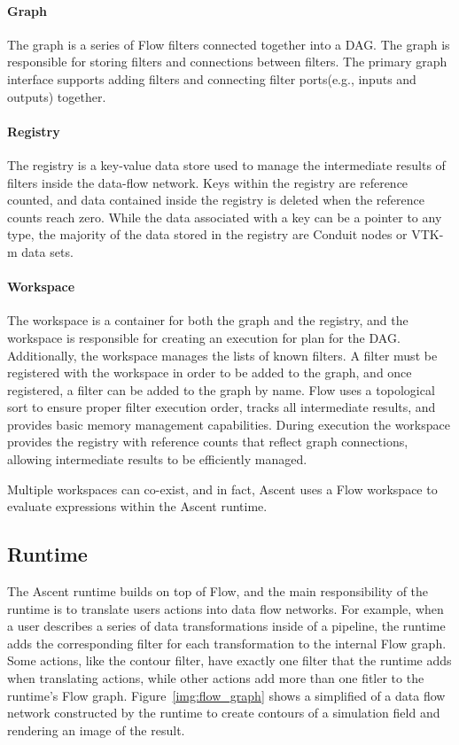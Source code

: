 \paragraph{Graph}
The graph is a series of Flow filters connected together into
a DAG.
%
The graph is responsible for storing filters and connections
between filters.
%
The primary graph interface supports adding filters and connecting
filter ports(e.g., inputs and outputs) together.

\paragraph{Registry}
The registry is a key-value data store used to manage the intermediate
results of filters inside the data-flow network.
%
Keys within the registry are reference counted, and data contained
inside the registry is deleted when the reference counts reach zero.
%
While the data associated with a key can be a pointer to any type,
the majority of the data stored in the registry are Conduit nodes
or VTK-m data sets.


\paragraph{Workspace}
The workspace is a container for both the graph and the registry,
and the workspace is responsible for creating an execution for plan
for the DAG.
%
Additionally, the workspace manages the lists of known filters.
%
A filter must be registered with the workspace in order to be added to the
graph, and once registered, a filter can be added to the graph by name.
%
Flow uses a topological sort to ensure proper filter execution order,
tracks all intermediate results, and provides basic memory management capabilities.
During execution the workspace provides the registry with reference counts that reflect graph connections, allowing intermediate results to be efficiently managed.

%
Multiple workspaces can co-exist, and in fact, Ascent uses a Flow workspace
to evaluate expressions within the Ascent runtime.
%

\subsection{Runtime}
The Ascent runtime builds on top of Flow, and the main responsibility of the
runtime is to translate users actions into data flow networks.
%
For example, when a user describes a series of data transformations inside of a pipeline,
the runtime adds the corresponding filter for each transformation to
the internal Flow graph.
%
Some actions, like the contour filter, have exactly one filter that the runtime
adds when translating actions, while other actions add more than one fitler to the runtime's
Flow graph.
%
Figure~\ref{img:flow_graph} shows a simplified of a data flow network constructed by the
runtime to create contours of a simulation field and rendering an image of the result.
%

